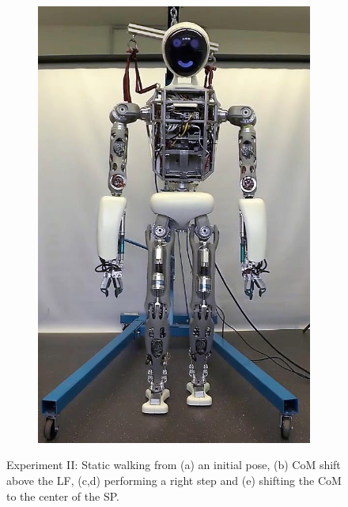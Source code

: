 \begin{figure}
\begin{subfigure}{.2\textwidth}
	\includegraphics[width=.95\linewidth]{experiments/walkStatic/snaps/5}
	\caption{}
	\end{subfigure}%
\caption[Experiment II: Static walking]{Experiment II: Static walking from (a) an initial pose, (b) \gls{CoM} shift above the \gls{LF}, (c,d) performing a right step and (e) shifting the \gls{CoM} to the center of the \gls{SP}.}
\label{exp:staticWalkingSnaps}
\end{figure} 

